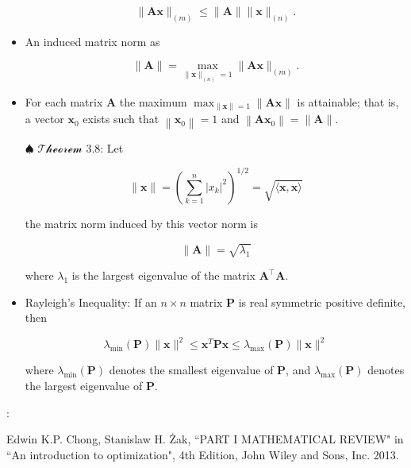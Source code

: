 \documentclass[12pt,thmsa]{article}
\begin{document}
\begin{itemize}
	\begin{equation*}
		\|\boldsymbol{A} \boldsymbol{x}\|_{(m)} \leq\|\boldsymbol{A}\|\|\boldsymbol{x}\|_{(n)}.
	\end{equation*}

	\item An induced matrix norm as
	
	\begin{equation*}
		\|\boldsymbol{A}\|=\max _{\|\boldsymbol{x}\|_{(n)}=1}\|\boldsymbol{A} \boldsymbol{x}\|_{(m)}.
	\end{equation*}

	\item For each matrix \(\boldsymbol{A}\) the maximum \(\max _{\|\boldsymbol{x}\|=1}\|\boldsymbol{A} \boldsymbol{x}\|\) is attainable; that is, a vector \(\boldsymbol{x}_{0}\) exists such that \(\left\|\boldsymbol{x}_{0}\right\|=1\) and \(\left\|\boldsymbol{A} \boldsymbol{x}_{0}\right\|=\|\boldsymbol{A}\|\).
	
	\item[\(\spadesuit\)] \(\mathcal{Theorem}\) 3.8: Let
	
	\begin{equation*}
		\|\boldsymbol{x}\|=\left(\sum_{k=1}^{n}\left|x_{k}\right|^{2}\right)^{1 / 2}=\sqrt{\langle\boldsymbol{x}, \boldsymbol{x}\rangle}
	\end{equation*}
	
	the matrix norm induced by this vector norm is
	
	\begin{equation*}
		\|\boldsymbol{A}\|=\sqrt{\lambda_{1}}
	\end{equation*}
	
	where \(\lambda_{1}\) is the largest eigenvalue of the matrix \(\boldsymbol{A}^{\top} \boldsymbol{A}\).
	
	\item Rayleigh's Inequality: If an \(n \times n\) matrix \(\boldsymbol{P}\) is real symmetric positive definite, then
	
	\begin{equation*}
		\lambda_{\min }(\boldsymbol{P})\|\boldsymbol{x}\|^{2} \leq \boldsymbol{x}^{T} \boldsymbol{P} \boldsymbol{x} \leq \lambda_{\max }(\boldsymbol{P})\|\boldsymbol{x}\|^{2}
	\end{equation*}
	
	where \(\lambda_{\min }(\boldsymbol{P})\) denotes the smallest eigenvalue of \(\boldsymbol{P}\), and \(\lambda_{\max }(\boldsymbol{P})\) denotes the largest eigenvalue of \(\boldsymbol{P}\). 
	
\end{itemize}

\medskip

\noindent
[Ref]: 

Edwin K.P. Chong, Stanislaw H. Żak, ``PART I MATHEMATICAL REVIEW" in ``An introduction to optimization", 4th Edition, John Wiley and Sons, Inc. 2013.
\end{document}

